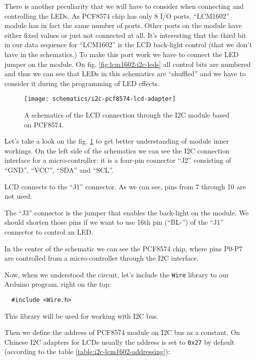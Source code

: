 \documentclass[../sparc.tex]{subfiles}
\begin{document}
There is another peculiarity that we will have to consider when connecting and
controlling the LEDs.  As PCF8574 chip has only 8 I/O ports, ``LCM1602'' module
has in fact the same number of ports.  Other ports on the module have either
fixed values or just not connected at all.  It's interesting that the third bit
in our data sequence for ``LCM1602'' is the LCD back-light control (that we
don't have in the schematics.)  To make this port work we have to connect the
LED jumper on the module.  On fig. \ref{fig:lcm1602-i2c-leds} all control bits
are numbered and thus we can see that LEDs in this schematics are ``shuffled''
and we have to consider it during the programming of LED effects.

\begin{figure}[H]
  \centering
  \texttt{[image: schematics/i2c-pcf8574-lcd-adapter]}
  \caption{A schematics of the LCD connection through the I2C module based on
    PCF8574.}
  \label{fig:i2c-pcf8574-lcd-adapter-schematics}
\end{figure}

Let's take a look on the fig. \ref{fig:i2c-pcf8574-lcd-adapter-schematics} to
get better understanding of module inner workings.  On the left side of the
schematics we can see the I2C connection interface for a micro-controller: it is
a four-pin connector ``J2'' consisting of ``GND'', ``VCC'', ``SDA'' and ``SCL''.

LCD connects to the ``J1'' connector.  As we can see, pins from 7 through 10 are
not used.

The ``J3'' connector is the jumper that enables the back-light on the module.
We should shorten those pins if we want to use 16th pin (``BL-'') of the ``J1''
connector to control an LED.

In the center of the schematic we can see the PCF8574 chip, where pins P0-P7 are
controlled from a micro-controller through the I2C interface.

Now, when we understood the circuit, let's include the \texttt{Wire} library to
our Arduino program, right on the top:

\begin{verbatim}
  #include <Wire.h>
\end{verbatim}

This library will be used for working with I2C bus.

Then we define the address of PCF8574 module on I2C bus as a constant.  On
Chinese I2C adapters for LCDs usually the address is set to \texttt{0x27} by
default (according to the table \ref{table:i2c-lcm1602-addressing}):
\end{document}
